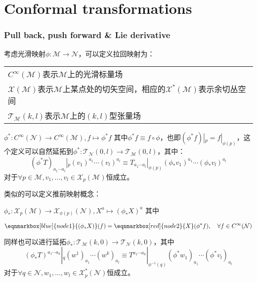 \part{Conformal transformations}
\setcounter{theorem}{0}
\setcounter{definition}{0}
\setcounter{lemma}{0}
\setcounter{sidenote}{1}

\section{Pull back, push forward \& Lie derivative}
考虑光滑映射$\phi:\mathcal{M}\to\mathcal{N}$，可以定义拉回映射为：
\begin{margintable}\footnotesize 
	\begin{tabularx}{\marginparwidth}{|X}
		$C^{\infty}(\mathcal{M})$表示$\mathcal{M}$上的光滑标量场\\
		$\mathscr{X}(\mathcal{M})$表示$\mathcal{M}$上某点处的切矢空间，相应的$\mathscr{X}^*(\mathcal{M})$表示余切丛空间\\
		$\mathscr{T}_\mathcal{M}(k,l)$表示$\mathcal{M}$上的$(k,l)$型张量场
	\end{tabularx}
\end{margintable}
\begin{definition}
	$\phi^*: C^{\infty}(\mathcal{N})\to C^{\infty}(\mathcal{M}),f\mapsto \phi^*f$
	其中$\phi^*f\equiv f\circ\phi$，也即$(\phi^*f)|_p=f|_{\phi(p)}$，这个定义可以自然延拓到$\phi^*:\mathscr{T}_\mathcal{N}(0,l)\to\mathscr{T}_\mathcal{M}(0,l)$，其中：
	\begin{equation*}
		(\phi^*T)_{a_1\cdots a_l}|_p(v_1)^{a_1}\cdots (v_l)^{a_l}\equiv
		T_{a_1\cdots a_l}|_{\phi(p)}(\phi_*v_1)^{a_1}\cdots (\phi_*v_l)^{a_l}
	\end{equation*}
	对于$\forall p\in\mathcal{M},v_1,\ldots,v_l\in\mathscr{X}_p(\mathcal{M})$恒成立。
\end{definition}
类似的可以定义推前映射概念：
\begin{definition}
	$\phi_*: \mathscr{X}_p(\mathcal{M})\to \mathscr{X}_{\phi(p)}(\mathcal{N}),X^a\mapsto (\phi_*X)^a$
	其中
	
	\begin{equation*}
	\eqnmarkbox[blue]{node1}{(\phi_*X)}(f)=\eqnmarkbox[red]{node2}{X}(\phi^*f),\quad\forall f\in C^\infty(\mathcal{N})	
	\end{equation*}
	
	同样也可以进行延拓$\phi_*:\mathscr{T}_\mathcal{M}(k,0)\to\mathscr{T}_\mathcal{N}(k,0)$，其中
	\[
		(\phi_*T)^{a_1\cdots a_k}|_{q}(w^1)_{a_1}\cdots (w^k)_{a_l}\equiv
		T^{a_1\cdots a_k}|_{\phi^{-1}(q)}(\phi^*w_1)_{a_1}\cdots (\phi^*v_l)_{a_l}
	\]
	对于$\forall q\in\mathcal{N},w_1,\ldots,w_l\in\mathscr{X}^*_p(\mathcal{N})$恒成立。
\end{definition}

